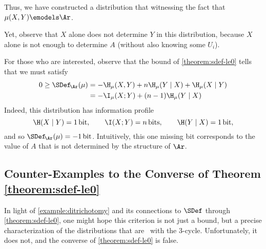 \begin{subappendices}
\begin{example}
    Thus, we have constructed a distribution that witnessing the fact that $\mu(X,Y) \emodels \Ar$.  
    
    Yet, observe that $X$ alone does not determine $Y$ in this distribution, because $X$ alone is not enough to determine $A$ (without also knowing some $U_i$). 
        
    For those who are interested, 
    observe that the bound of \cref{theorem:sdef-le0} tells that
    we must satisfy 
    \begin{align*}
    0 \ge
        \SDef_{\!\Ar}(\mu)
        &= - \H_\mu(X,Y) + n \H_\mu(Y \mid  X) + \H_\mu(X \mid Y) \\
        &= - \I_\mu(X;Y) + (n-1) \H_\mu(Y \mid X)  
    \end{align*}
    Indeed, this distribution has information profile 
    \[
        \H(X \mid Y) = 1\,\text{bit},\qquad
        \I(X ; Y) = n\,\text{bits},\qquad
        \H(Y \mid X) = 1\,\text{bit},
    \]
    and so $\SDef_{\!\Ar}(\mu) = -1\,\text{bit}$. 
    Intuitively, this one missing bit corresponds to the value of $A$ that is not determined by the structure of $\Ar$.
\end{example}


\subsection{Counter-Examples to the Converse of Theorem \ref{theorem:sdef-le0}}
    \label{appendix:converse-sdef-le0}

In light of 
\cref{example:ditrichotomy}
and its connections to 
$\SDef$
through \cref{theorem:sdef-le0},
one might hope this criterion is not just a bound, but
    a precise characterization of the distributions that are \scible\ 
    with the 3-cycle. 
Unfortunately, it does not, and the converse of \cref{theorem:sdef-le0} is false.


\end{subappendices}

